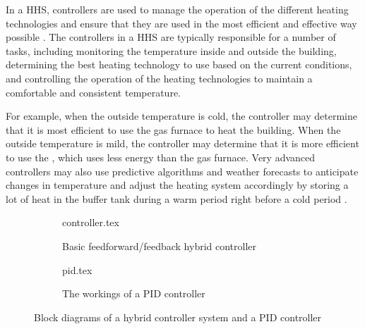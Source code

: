 In a \ac{HHS}, controllers are used to manage the operation of the different heating technologies and ensure that they are used in the most efficient and effective way possible \cite{di_perna_experimental_2015,bagarella_annual_2016,roccatello_analysis_2022,demirezen_feasibility_2021,mugnini_variable-load_2021,bianco_estimation_2017}. The controllers in a \ac{HHS} are typically responsible for a number of tasks, including monitoring the temperature inside and outside the building, determining the best heating technology to use based on the current conditions, and controlling the operation of the heating technologies to maintain a comfortable and consistent temperature.

For example, when the outside temperature is cold, the controller may determine that it is most efficient to use the gas furnace to heat the building. When the outside temperature is mild, the controller may determine that it is more efficient to use the \HP, which uses less energy than the gas furnace. Very advanced controllers may also use predictive algorithms and weather forecasts to anticipate changes in temperature and adjust the heating system accordingly by storing a lot of heat in the buffer tank during a warm period right before a cold period \cite{demirezen_feasibility_2021}.


\begin{figure}[htb]
    \centering
    \begin{subfigure}[t]{1\textwidth}
        \centering
        {controller.tex}
        \caption{Basic feedforward/feedback hybrid controller \cite{elprofessor_tikz_2019}}
        \label{fig:controller}
    \end{subfigure}
    \hfill
    \begin{subfigure}[t]{0.5\textwidth}
        \centering
        {pid.tex}
        \caption{The workings of a \acs{PID} controller \cite{mmm_left_2012}}
        \label{fig:pid}
    \end{subfigure}
    \caption{Block diagrams of a hybrid controller system and a \acs{PID} controller}
    \label{fig:visualisations}
\end{figure}

